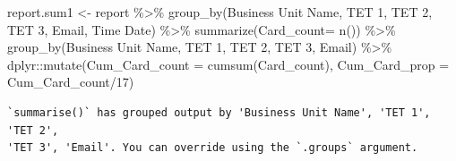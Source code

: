 \documentclass[
  letterpaper,
  DIV=11,
  numbers=noendperiod]{scrartcl}
\newenvironment{Shaded}{\begin{snugshade}}{\end{snugshade}}
\newcommand{\AttributeTok}[1]{\textcolor[rgb]{0.40,0.45,0.13}{#1}}
\newcommand{\DecValTok}[1]{\textcolor[rgb]{0.68,0.00,0.00}{#1}}
\newcommand{\FunctionTok}[1]{\textcolor[rgb]{0.28,0.35,0.67}{#1}}
\newcommand{\NormalTok}[1]{\textcolor[rgb]{0.00,0.23,0.31}{#1}}
\newcommand{\OtherTok}[1]{\textcolor[rgb]{0.00,0.23,0.31}{#1}}
\newcommand{\SpecialCharTok}[1]{\textcolor[rgb]{0.37,0.37,0.37}{#1}}
\newcommand{\StringTok}[1]{\textcolor[rgb]{0.13,0.47,0.30}{#1}}
\begin{document}
\begin{Shaded}
\begin{Highlighting}[]
\NormalTok{report.sum1 }\OtherTok{\textless{}{-}}\NormalTok{ report }\SpecialCharTok{\%\textgreater{}\%} 
  \FunctionTok{group\_by}\NormalTok{(}\StringTok{\textasciigrave{}}\AttributeTok{Business Unit Name}\StringTok{\textasciigrave{}}\NormalTok{, }\StringTok{\textasciigrave{}}\AttributeTok{TET 1}\StringTok{\textasciigrave{}}\NormalTok{, }\StringTok{\textasciigrave{}}\AttributeTok{TET 2}\StringTok{\textasciigrave{}}\NormalTok{, }\StringTok{\textasciigrave{}}\AttributeTok{TET 3}\StringTok{\textasciigrave{}}\NormalTok{, Email, }\StringTok{\textasciigrave{}}\AttributeTok{Time Date}\StringTok{\textasciigrave{}}\NormalTok{) }\SpecialCharTok{\%\textgreater{}\%}
  \FunctionTok{summarize}\NormalTok{(}\AttributeTok{Card\_count=} \FunctionTok{n}\NormalTok{()) }\SpecialCharTok{\%\textgreater{}\%}
  \FunctionTok{group\_by}\NormalTok{(}\StringTok{\textasciigrave{}}\AttributeTok{Business Unit Name}\StringTok{\textasciigrave{}}\NormalTok{, }\StringTok{\textasciigrave{}}\AttributeTok{TET 1}\StringTok{\textasciigrave{}}\NormalTok{, }\StringTok{\textasciigrave{}}\AttributeTok{TET 2}\StringTok{\textasciigrave{}}\NormalTok{, }\StringTok{\textasciigrave{}}\AttributeTok{TET 3}\StringTok{\textasciigrave{}}\NormalTok{, Email) }\SpecialCharTok{\%\textgreater{}\%}
\NormalTok{  dplyr}\SpecialCharTok{::}\FunctionTok{mutate}\NormalTok{(}\AttributeTok{Cum\_Card\_count =} \FunctionTok{cumsum}\NormalTok{(Card\_count),}
                \AttributeTok{Cum\_Card\_prop =}\NormalTok{ Cum\_Card\_count}\SpecialCharTok{/}\DecValTok{17}\NormalTok{)}
\end{Highlighting}
\end{Shaded}

\begin{verbatim}
`summarise()` has grouped output by 'Business Unit Name', 'TET 1', 'TET 2',
'TET 3', 'Email'. You can override using the `.groups` argument.
\end{verbatim}
\end{document}

